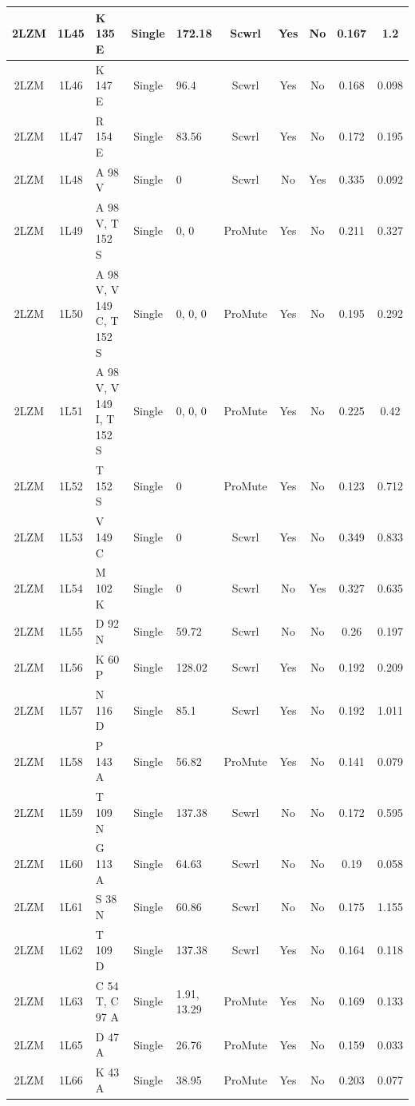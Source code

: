 \documentclass[sigconf]{acmart}
\begin{document}
\begin{table}[]
{\begin{tabular}{|c|c|p{2.8cm}|c|p{2.8cm}|c|c|c|c|c|}
		2LZM & 1L45 & K 135 E & Single & 172.18 & Scwrl & Yes & No & 0.167 & 1.2 \\ \hline
		2LZM & 1L46 & K 147 E & Single & 96.4 & Scwrl & Yes & No & 0.168 & 0.098 \\ \hline
		2LZM & 1L47 & R 154 E & Single & 83.56 & Scwrl & Yes & No & 0.172 & 0.195 \\ \hline
		2LZM & 1L48 & A 98 V & Single & 0 & Scwrl & No & Yes & 0.335 & 0.092 \\ \hline
		2LZM & 1L49 & A 98 V, T 152 S & Single & 0, 0 & ProMute & Yes & No & 0.211 & 0.327 \\ \hline
		2LZM & 1L50 & A 98 V, V 149 C, T 152 S & Single & 0, 0, 0 & ProMute & Yes & No & 0.195 & 0.292 \\ \hline
		2LZM & 1L51 & A 98 V, V 149 I, T 152 S & Single & 0, 0, 0 & ProMute & Yes & No & 0.225 & 0.42 \\ \hline
		2LZM & 1L52 & T 152 S & Single & 0 & ProMute & Yes & No & 0.123 & 0.712 \\ \hline
		2LZM & 1L53 & V 149 C & Single & 0 & Scwrl & Yes & No & 0.349 & 0.833 \\ \hline
		2LZM & 1L54 & M 102 K & Single & 0 & Scwrl & No & Yes & 0.327 & 0.635 \\ \hline
		2LZM & 1L55 & D 92 N & Single & 59.72 & Scwrl & No & No & 0.26 & 0.197 \\ \hline
		2LZM & 1L56 & K 60 P & Single & 128.02 & Scwrl & Yes & No & 0.192 & 0.209 \\ \hline
		2LZM & 1L57 & N 116 D & Single & 85.1 & Scwrl & Yes & No & 0.192 & 1.011 \\ \hline
		2LZM & 1L58 & P 143 A & Single & 56.82 & ProMute & Yes & No & 0.141 & 0.079 \\ \hline
		2LZM & 1L59 & T 109 N & Single & 137.38 & Scwrl & No & No & 0.172 & 0.595 \\ \hline
		2LZM & 1L60 & G 113 A & Single & 64.63 & Scwrl & No & No & 0.19 & 0.058 \\ \hline
		2LZM & 1L61 & S 38 N & Single & 60.86 & Scwrl & No & No & 0.175 & 1.155 \\ \hline
		2LZM & 1L62 & T 109 D & Single & 137.38 & Scwrl & Yes & No & 0.164 & 0.118 \\ \hline
		2LZM & 1L63 & C 54 T, C 97 A & Single & 1.91, 13.29 & ProMute & Yes & No & 0.169 & 0.133 \\ \hline
		2LZM & 1L65 & D 47 A & Single & 26.76 & ProMute & Yes & No & 0.159 & 0.033 \\ \hline
		2LZM & 1L66 & K 43 A & Single & 38.95 & ProMute & Yes & No & 0.203 & 0.077 \\ \hline

\end{tabular}}
\end{table}
\end{document}
